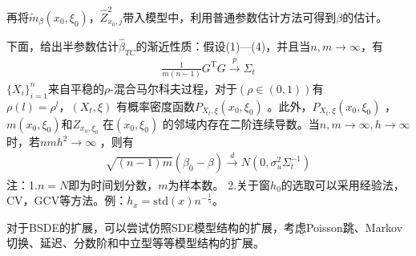 		再将${{\tilde m}_\beta }\left( {{x_0},{\xi _0}} \right)$，$\hat Z_{{x_0},j}^2$带入模型中，利用普通参数估计方法可得到$\beta$的估计。
		\par
		下面，给出半参数估计$\hat{\beta}_{TC}$的渐近性质：假设(1)—(4)，并且当$n,m \rightarrow \infty$，有
		\begin{align*}
		\frac{1}{m({n - 1})} {G^\mathrm{T}}G{\xrightarrow{p}}{\Sigma}_t
		\end{align*}
		$\{ X_i\}_{i=1}^n$来自平稳的$\rho$-混合马尔科夫过程，对于$(\rho \in(0,1))$有$\rho(l)={\rho}^l ，(X_t,\xi)$ 有概率密度函数$P_{{X_t},\xi}(x_0,\xi_0)$ 。此外，$P_{{X_t},\xi}(x_0,\xi_0)$ ， $m(x_0,\xi_0)$和$Z_{x_0,\xi_0}$ 在$(x_0,\xi_0)$ 的邻域内存在二阶连续导数。当${n,m}\rightarrow\infty,h\rightarrow\infty$时，若$nmh^2\rightarrow\infty$ ，则有
		\begin{align*}
		{\sqrt {(n-1)m}} \left( {\hat \beta_0  - \beta } \right)\xrightarrow{d} N\left( {0,{\sigma ^2_u}{{\Sigma}_t ^{ - 1}}} \right)
		\end{align*}
		注：1.$n=N$即为时间划分数，$m$为样本数。
		2.关于窗$h_0$的选取可以采用经验法，CV，GCV等方法。例：$h_x=\mathrm{std}(x) n^{-\frac 15}$。
		\par
		对于BSDE的扩展，可以尝试仿照SDE模型结构的扩展，考虑Poisson跳、Markov切换、延迟、分数阶和中立型等等模型结构的扩展。


% 
